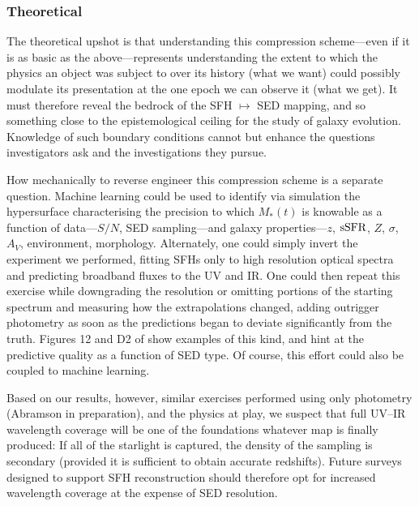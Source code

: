 \documentclass[a4paper,fleqn,usenatbib]{mnras}
\newcommand{\Mstel}{M_\ast}
\newcommand{\ssfr}{{\rm sSFR}}
\begin{document}
\subsubsection{Theoretical}

The theoretical upshot is that understanding this compression scheme---even if it is as basic 
as the above---represents understanding the extent to which the
physics an object was subject to over its history (what we want) could possibly modulate its 
presentation at the one epoch we can observe it (what we get). It must therefore reveal the bedrock 
of the SFH $\mapsto$ SED mapping, and so something close to the epistemological 
ceiling for the study of galaxy evolution. Knowledge of such boundary conditions cannot but 
enhance the questions investigators ask and the investigations they pursue. 

How mechanically to reverse engineer this compression scheme is a separate question. Machine learning 
could be used to identify via simulation the hypersurface characterising the precision to which 
$\Mstel(t)$ is knowable as a function of data---$S/N$, SED sampling---and galaxy 
properties---$z$, $\ssfr$, $Z$, $\sigma$, $A_{V}$, environment, morphology. Alternately, one
could simply invert the experiment we performed, fitting SFHs only to high resolution optical 
spectra and predicting broadband fluxes to the UV and IR. One could then repeat this exercise 
while downgrading the resolution or omitting portions of the starting spectrum and measuring how 
the extrapolations changed, adding outrigger photometry as soon as the predictions began to deviate
significantly from the truth. Figures 12 and D2 of \citet{Abramson20} show examples of this kind, 
and hint at the predictive quality as a function of SED type. Of course, this effort could also be coupled 
to machine learning.


Based on our results, however, similar exercises performed using only photometry 
(Abramson in preparation), and the physics at play, we suspect that full UV--IR 
wavelength coverage will be one of the foundations whatever map is finally produced: If all of 
the starlight is captured, the density of the sampling is secondary (provided it is sufficient
to obtain accurate redshifts). Future surveys designed to support SFH reconstruction should 
therefore opt for increased wavelength coverage at the expense of SED resolution. 
\end{document}
